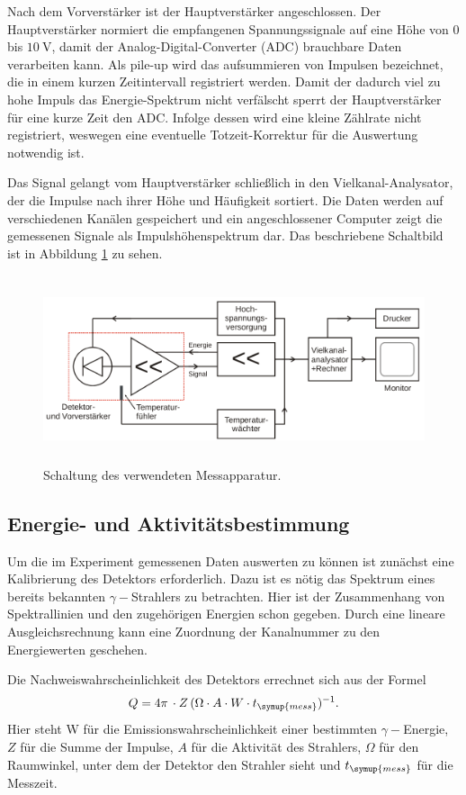 Nach dem Vorverstärker ist der Hauptverstärker angeschlossen.
Der Hauptverstärker normiert die empfangenen Spannungssignale auf eine Höhe von $0$ bis $\SI{10}{\volt}$, damit der Analog-Digital-Converter (ADC) brauchbare Daten verarbeiten kann.
Als pile-up wird das aufsummieren von Impulsen bezeichnet, die in einem kurzen Zeitintervall registriert werden.
Damit der dadurch viel zu hohe Impuls das Energie-Spektrum nicht verfälscht sperrt der Hauptverstärker für eine kurze Zeit den ADC.
Infolge dessen wird eine kleine Zählrate nicht registriert, weswegen eine eventuelle Totzeit-Korrektur für die Auswertung notwendig ist.

Das Signal gelangt vom Hauptverstärker schließlich in den Vielkanal-Analysator, der die Impulse nach ihrer Höhe und Häufigkeit sortiert.
Die Daten werden auf verschiedenen Kanälen gespeichert und ein angeschlossener Computer zeigt die gemessenen Signale als Impulshöhenspektrum dar.
Das beschriebene Schaltbild ist in Abbildung \ref{fig:Schaltung} zu sehen.
 \begin{figure}
   \centering
   \includegraphics[height=5.5cm]{content/Schaltung.png}
   \caption{Schaltung des verwendeten Messapparatur.\cite{V18}}
   \label{fig:Schaltung}
 \end{figure}
\subsection{Energie- und Aktivitätsbestimmung}
Um die im Experiment gemessenen Daten auswerten zu können ist zunächst eine Kalibrierung des Detektors erforderlich.
Dazu ist es nötig das Spektrum eines bereits bekannten $\gamma-$Strahlers zu betrachten.
Hier ist der Zusammenhang von Spektrallinien und den zugehörigen Energien schon gegeben.
Durch eine lineare Ausgleichsrechnung kann eine Zuordnung der Kanalnummer zu den Energiewerten geschehen.

Die Nachweiswahrscheinlichkeit des Detektors errechnet sich aus der Formel
\begin{equation}
\label{eqn:eff} 
Q = 4\pi\,\cdot Z\,(\Omega\cdot A\cdot W\cdot t_{\symup{mess}})^{-1}.
\end{equation}
Hier steht W für die Emissionswahrscheinlichkeit einer bestimmten $\gamma-$Energie, $Z$ für die Summe der Impulse, $A$ für die Aktivität des Strahlers, $\Omega$ für den Raumwinkel, unter dem der Detektor den Strahler sieht und $t_{\symup{mess}}$ für die Messzeit.

